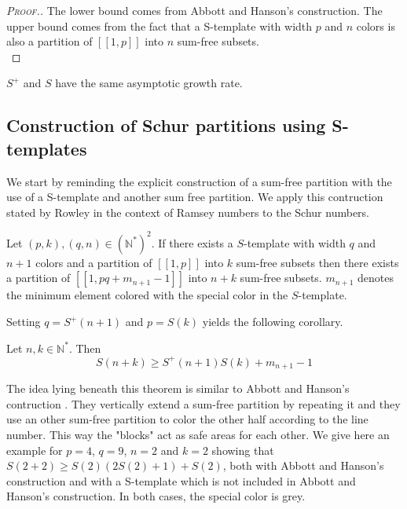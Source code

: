 \begin{proof}[\textsc{Proof.}]
The lower bound comes from Abbott and Hanson's construction. The upper bound comes from the 
fact that a S-template with width \(p\) and \(n\) colors is also a partition of \([\![1, p]\!]\) into \(n\) sum-free subsets. \\
\end{proof}

\begin{remark}
	\(S^+\) and \(S\) have the same asymptotic growth rate.
\end{remark}


\subsection{Construction of Schur partitions using S-templates}

\qquad We start by reminding the explicit construction of a sum-free partition with the use of a S-template and another sum free partition. We apply this contruction stated by Rowley in the context of Ramsey numbers to the Schur numbers.

\begin{theorem}
\label{Theorem2.4}
	Let \((p,k), (q,n) \in (\mathbb{N}^*)^2\). If there exists a \(S\)-template with width \(q\) and \(n+1\) colors 
	and a partition of \([\![1,p]\!]\) into \(k\) sum-free subsets then there exists a partition of \([\![1,pq+m_{n+1}
	-1]\!]\) into \(n+k\) sum-free subsets. \(m_{n+1}\) denotes the minimum element colored with the special color in the \(S\)-template.
\end{theorem}

Setting \(q = S^+(n+1)\) and \(p = S(k)\) yields the following corollary.

\begin{corollary}
\label{Corollary2.5}
	Let \(n, k \in \mathbb{N}^*\). Then
	\[ S(n+k) \geqslant S^+(n+1)S(k) + m_{n+1} - 1 \]
\end{corollary}

The idea lying beneath this theorem is similar to Abbott and Hanson's contruction \cite{AbbottHanson}. They vertically 
extend a sum-free partition by repeating it and they use an other sum-free partition to color the other half according 
to the line number. This way the "blocks" act as safe areas for each other. We give here an example for \(p = 4\), 
\(q = 9\), \(n = 2\) and \(k = 2\) showing that \(S(2 + 2) \geqslant S(2) (2 S(2) + 1) + S(2)\), both with Abbott and 
Hanson's construction and with a S-template which is not included in Abbott and Hanson's construction. In both cases, 
the special color is grey.

